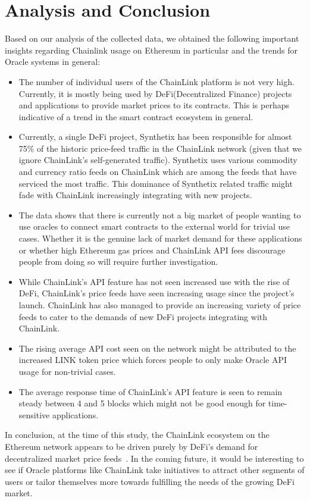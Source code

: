 \documentclass[runningheads]{llncs}
\begin{document}
\section{Analysis and Conclusion}
Based on our analysis of the collected data, we obtained the following important insights regarding Chainlink usage on Ethereum in particular and the trends for Oracle systems in general:
\begin{itemize}
\item	The number of individual users of the ChainLink platform is not very high. Currently, it is mostly being used by DeFi(Decentralized Finance) projects and applications to provide market prices to its contracts. This is perhaps indicative of a trend in the smart contract ecosystem in general.
\item	Currently, a single DeFi project, Synthetix has been responsible for almost 75\% of the historic price-feed traffic in the ChainLink network (given that we ignore ChainLink's self-generated traffic). Synthetix uses various commodity and currency ratio feeds on ChainLink which are among the feeds that have serviced the most traffic. This dominance of Synthetix related traffic might fade with ChainLink increasingly integrating with new projects. 
\item	The data shows that there is currently not a big market of people wanting to use oracles to connect smart contracts to the external world for trivial use cases. Whether it is the genuine lack of market demand for these applications or whether high Ethereum gas prices and ChainLink API fees discourage people from doing so will require further investigation.   
\item	While ChainLink's API feature has not seen increased use with the rise of DeFi, ChainLink's price feeds have seen increasing usage since the project's launch. ChainLink has also managed to provide an increasing variety of price feeds to cater to the demands of new DeFi projects integrating with ChainLink.
\item	The rising average API cost seen on the network might be attributed to the increased LINK token price which forces people to only make Oracle API usage for non-trivial cases.
\item	The average response time of ChainLink's API feature is seen to remain steady between 4 and 5 blocks which might not be good enough for time-sensitive applications.
\end{itemize}

In conclusion, at the time of this study, the ChainLink ecosystem on the Ethereum network appears to be driven purely by DeFi's demand for decentralized market price feeds~\cite{liu2020look}. In the coming future, it would be interesting to see if Oracle platforms like ChainLink take initiatives to attract other segments of users or tailor themselves more towards fulfilling the needs of the growing DeFi market.
\end{document}
